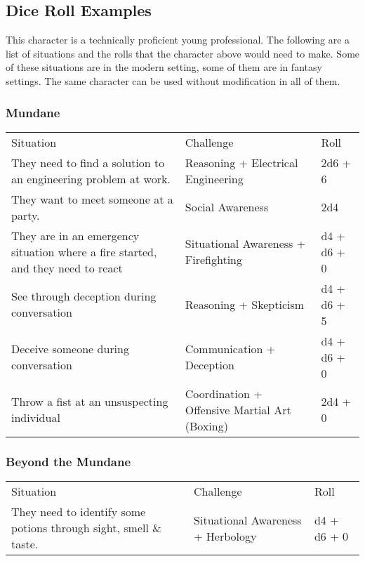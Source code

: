 \documentclass{LegrandOrangeTufteBook}
\newcommand{\termCore}[1]{\textcolor{colorCoreCompetency}{#1}}
\begin{document}
\subsection*{Dice Roll Examples}

This character is a technically proficient young professional. The following are a list of situations and the rolls that the character above would need to make.
Some of these situations are in the modern setting, some of them are in fantasy settings. The same character can be used without modification in all of them.

\subsubsection*{Mundane}

\begin{center}
	\begin{xltabular}{\textwidth}{Xll}
				Situation												& Challenge 								& Roll \\
	They need to find a solution to an engineering problem at work.				& \termCore{Reasoning} + Electrical Engineering		& 2d6 + 6 \\
				They want to meet someone at a party.								& \termCore{Social Awareness}					& 2d4 \\
	They are in an emergency situation where a fire started, and they need to react	& \termCore{Situational Awareness} + Firefighting 		& d4 + d6 + 0 \\
		 		See through deception during conversation							& \termCore{Reasoning} + Skepticism				& d4 + d6 + 5 \\
	Deceive someone during conversation 								& \termCore{Communication} + Deception			& d4 + d6 + 0 \\
		 		Throw a fist at an unsuspecting individual							& \termCore{Coordination} + Offensive Martial Art (Boxing)	& 2d4 + 0 \\
	\end{xltabular}
\end{center}

\subsubsection*{Beyond the Mundane}

\begin{center}
	\begin{xltabular}{\textwidth}{Xll}
				Situation												& Challenge 								& Roll \\
	They need to identify some potions through sight, smell \& taste. 				& \termCore{Situational Awareness} + Herbology		& d4 + d6 + 0 \\
	\end{xltabular}
\end{center}
\end{document}
